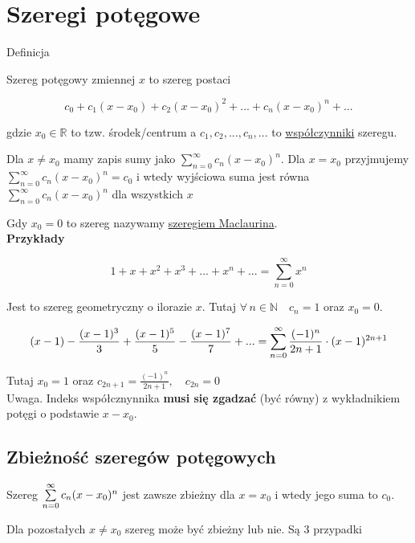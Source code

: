 \section{Szeregi potęgowe}

Definicja

Szereg potęgowy zmiennej $x$ to szereg postaci

$$ c_0 + c_1(x - x_0) + c_2(x- x_0)^2 + ... + c_n(x - x_0)^n + ... $$

gdzie $x_0 \in \mathbb{R} $ to tzw. środek/centrum a $ c_1, c_2, ..., c_n, ... $ to \underline{współczynniki} szeregu.

Dla $x \neq x_0$ mamy zapis sumy jako $ \sum\limits_{n = 0}^{\infty} c_n(x - x_0)^n $. Dla $x = x_0$ przyjmujemy
$ \sum\limits_{n = 0}^{\infty} c_n(x - x_0)^n = c_0 $ i wtedy wyjściowa suma jest równa $ \sum\limits_{n = 0}^{\infty} c_n(x - x_0)^n $
dla wszystkich $x$

Gdy $x_0 = 0$ to szereg nazywamy \underline{szeregiem Maclaurina}. \\

\textbf{Przykłady}

$$ 1 + x + x^2 + x^3 + ... + x^n + ... = \sum\limits_{n = 0}^{\infty} x^n $$

Jest to szereg geometryczny o ilorazie $x$. Tutaj $ \forall \, n \in \mathbb{N} \quad c_n = 1 $ oraz $x_0 = 0$.

$$ (x - 1) - \frac{(x-1)^3}{3} + \frac{(x-1)^5}{5} - \frac{(x-1)^7}{7} + ... 
= \sum\limits_{n = 0}^{\infty} \frac{ (-1)^n }{ 2n+1 } \cdot (x-1)^{2n+1} $$

Tutaj $x_0 = 1$ oraz $ c_{2n+1} = \frac{ (-1)^n }{ 2n+1 }, \quad c_{2n} = 0 $ \\

Uwaga. Indeks współcznynnika \textbf{musi się zgadzać} (być równy) z wykładnikiem potęgi o podstawie $x-x_0$.


\subsection*{Zbieżność szeregów potęgowych}

Szereg $ \sum\limits_{n = 0}^{\infty} c_n(x-x_0)^n $ jest zawsze zbieżny dla $x=x_0$ i wtedy jego suma to $c_0$.

Dla pozostałych $x \neq x_0$ szereg może być zbieżny lub nie. Są 3 przypadki

